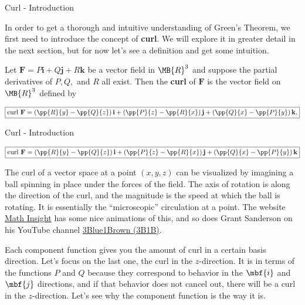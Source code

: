 \documentclass[11pt,english,
handout
]{beamer}
\begin{document}
\begin{frame}{Curl - Introduction}
\small

In order to get a thorough and intuitive understanding of Green's Theorem, we first need to introduce the concept of \textbf{curl}. We will explore it in greater detail in the next section, but for now let's see a definition and get some intuition.\pause 

\lspace
\begin{definition}
Let $\mathbf{F}=P\mathbf{i}+Q\mathbf{j}+R\mathbf{k}$ be a vector field in $\MB{R}^3$ and suppose the partial derivatives of $P,Q,$ and $R$ all exist. Then the \textbf{curl} of $\mathbf{F}$ is the vector field on $\MB{R}^3$ defined by

\[
\boxed{\text{curl }\mathbf{F}=\left(\pp{R}{y}-\pp{Q}{z}\right)\mathbf{i}+\left(\pp{P}{z}-\pp{R}{x}\right)\mathbf{j}+\left(\pp{Q}{x}-\pp{P}{y}\right)\mathbf{k}.}
\]
\end{definition}
\end{frame}










\begin{frame}[t]{Curl - Introduction}
\small

\[
\boxed{\text{curl }\mathbf{F}=\left(\pp{R}{y}-\pp{Q}{z}\right)\mathbf{i}+\left(\pp{P}{z}-\pp{R}{x}\right)\mathbf{j}+\left(\pp{Q}{x}-\pp{P}{y}\right)\mathbf{k}}
\]

\lspace
The curl of a vector space at a point $(x,y,z)$ can be visualized by imagining a ball spinning in place under the forces of the field. \pause The axis of rotation is along the direction of the curl, and the magnitude is the speed at which the ball is rotating. It is essentially the ``microscopic'' circulation at a point. The website \href{https://mathinsight.org/curl_idea}{Math Insight} has some nice animations of this, and so does Grant Sanderson on his YouTube channel \href{https://www.youtube.com/watch?v=erMopRd-MXg&list=PLSQl0a2vh4HC5feHa6Rc5c0wbRTx56nF7&index=60}{3Blue1Brown (3B1B)}. \pause 

\vspace{3mm}
Each component function gives you the amount of curl in a certain basis direction. Let's focus on the last one, the curl in the $z$-direction. \pause It is in terms of the functions $P$ and $Q$ because they correspond to behavior in the $\mbf{i}$ and $\mbf{j}$ directions, and if that behavior does not cancel out, there will be a curl in the $z$-direction. Let's see why the component function is the way it is.
\end{frame}
\end{document}
